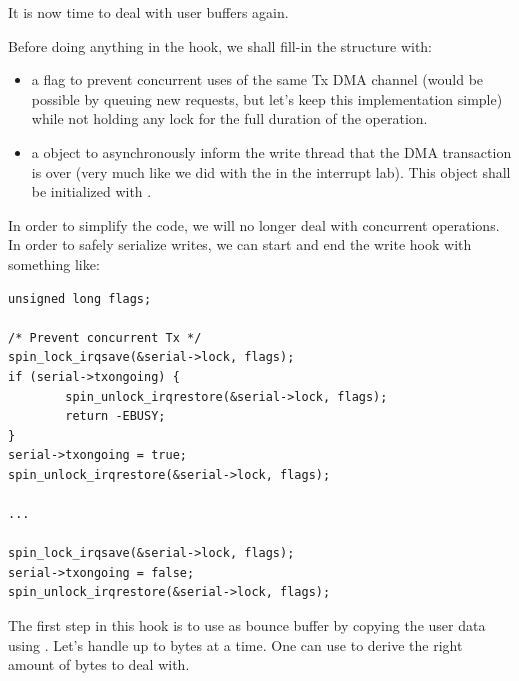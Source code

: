 It is now time to deal with user buffers again.

Before doing anything in the  hook, we shall fill-in the
 structure with:
\begin{itemize}
\item a  flag to prevent concurrent uses of the same
  Tx DMA channel (would be possible by queuing new requests, but let's keep this
  implementation simple) while not holding any lock for the full duration of
  the operation.
\item a  object to asynchronously inform the
  write thread that the DMA transaction is over (very much like we did with the
   in the interrupt lab). This object shall be initialized with
  .
\end{itemize}

\if{}\fi

In order to simplify the code, we will no longer deal with concurrent
operations. In order to safely serialize writes, we can start and end the write
hook with something like:

\begin{verbatim}
unsigned long flags;

/* Prevent concurrent Tx */
spin_lock_irqsave(&serial->lock, flags);
if (serial->txongoing) {
        spin_unlock_irqrestore(&serial->lock, flags);
        return -EBUSY;
}
serial->txongoing = true;
spin_unlock_irqrestore(&serial->lock, flags);

...

spin_lock_irqsave(&serial->lock, flags);
serial->txongoing = false;
spin_unlock_irqrestore(&serial->lock, flags);
\end{verbatim}

The first step in this  hook is to use  as
bounce buffer by copying the user data using . Let's
handle up to  bytes at a time. One can use 
to derive the right amount of bytes to deal with.

